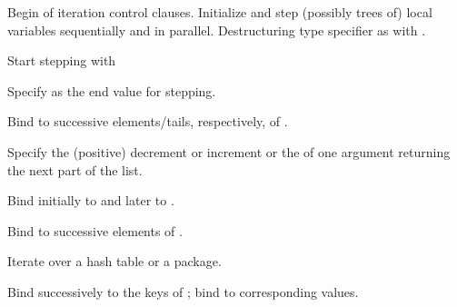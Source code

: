 \begin{LIST}{1cm}
\begin{LIST}{.5cm}
    {
      Begin of iteration control clauses. Initialize and step (possibly
      trees of) local variables  sequentially and 
      in parallel. Destructuring type specifier  as with
      .
    }

    \begin{LIST}{.5cm}

      {
        Start stepping with 
      }

      {
        Specify  as the end value for stepping.
      }

      {
        Bind  to successive elements/tails, respectively, of
        .
      }

      {
        Specify the (positive) decrement or increment or the
         of one argument returning the next part of the
        list.
      }

      {
        Bind  initially to  and later to
        .
      }

      {
        Bind  to successive elements of .
      }

      {
        Iterate over a hash table or a package.
      }

      \begin{LIST}{.5cm}

        {
          Bind  successively to the keys of ;
          bind  to corresponding values.
        }


\end{LIST}
\end{LIST}
\end{LIST}
\end{LIST}
